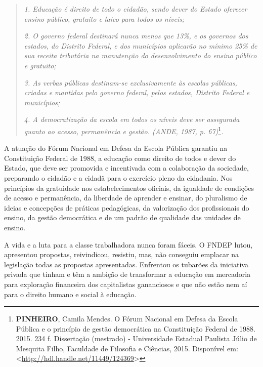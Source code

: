 \begin{quote}
\emph{1. Educação é direito de todo o cidadão, sendo dever do Estado
oferecer ensino público, gratuito e laico para todos os níveis;}

\emph{2. O governo federal destinará nunca menos que 13\%, e os governos
dos estados, do Distrito Federal, e dos municípios aplicarão no mínimo
25\% de sua receita tributária na manutenção do desenvolvimento do
ensino público e gratuito; }

\emph{3. As verbas públicas destinam-se exclusivamente às escolas
públicas, criadas e mantidas pelo governo federal, pelos estados,
Distrito Federal e municípios; }

\emph{4. A democratização da escola em todos os níveis deve ser
assegurada quanto ao acesso, permanência e gestão. (ANDE, 1987, p.
67)}\footnote{\textbf{PINHEIRO}, Camila Mendes. O Fórum Nacional em
  Defesa da Escola Pública e o princípio de gestão democrática na
  Constituição Federal de 1988. 2015. 234 f. Dissertação (mestrado) -
  Universidade Estadual Paulista Júlio de Mesquita Filho, Faculdade de
  Filosofia e Ciências, 2015. Disponível em:
  \textless{}\url{http://hdl.handle.net/11449/124369}\textgreater{}}\emph{.}
\end{quote}

A atuação do Fórum Nacional em Defesa da Escola Pública garantiu na
Constituição Federal de 1988, a educação como direito de todos e dever
do Estado, que deve ser promovida e incentivada com a colaboração da
sociedade, preparando o cidadão e a cidadã para o exercício pleno da
cidadania. Nos princípios da gratuidade nos estabelecimentos oficiais,
da igualdade de condições de acesso e permanência, da liberdade de
aprender e ensinar, do pluralismo de ideias e concepções de práticas
pedagógicas, da valorização dos profissionais do ensino, da gestão
democrática e de um padrão de qualidade das unidades de ensino.

A vida e a luta para a classe trabalhadora nunca foram fáceis. O FNDEP
lutou, apresentou propostas, reivindicou, resistiu, mas, não conseguiu
emplacar na legislação todas as propostas apresentadas. Enfrentou os
tubarões da iniciativa privada que tinham e têm a ambição de transformar
a educação em mercadoria para exploração financeira dos capitalistas
gananciosos e que não estão nem aí para o direito humano e social à
educação.

